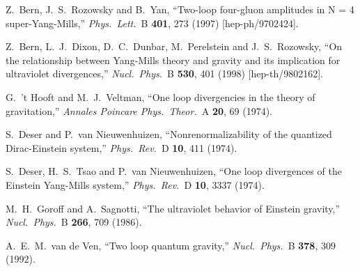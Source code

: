 \begin{thebibliography}{99}
Z.~Bern, J.~S.~Rozowsky and B.~Yan,
``Two-loop four-gluon amplitudes in N = 4 super-Yang-Mills,''
{\it Phys.\ Lett.}\ B {\bf 401}, 273 (1997)
[hep-ph/9702424].

Z.~Bern, L.~J.~Dixon, D.~C.~Dunbar, M.~Perelstein and J.~S.~Rozowsky,
``On the relationship between Yang-Mills theory and gravity and its
  implication for ultraviolet divergences,''
{\it Nucl.\ Phys.}\ B {\bf 530}, 401 (1998)
[hep-th/9802162].

G.~'t Hooft and M.~J.~Veltman,
``One loop divergencies in the theory of gravitation,''
{\it Annales Poincare Phys.\ Theor.}\ A {\bf 20}, 69 (1974).

S.~Deser and P.~van Nieuwenhuizen,
``Nonrenormalizability of the quantized Dirac-Einstein system,''
{\it Phys.\ Rev.}\ D {\bf 10}, 411 (1974).

S.~Deser, H.~S.~Tsao and P.~van Nieuwenhuizen,
``One loop divergences of the Einstein Yang-Mills system,''
{\it Phys.\ Rev.}\ D {\bf 10}, 3337 (1974).

M.~H.~Goroff and A.~Sagnotti,
``The ultraviolet behavior of Einstein gravity,''
{\it Nucl.\ Phys.}\ B {\bf 266}, 709 (1986).

A.~E.~M.~van de Ven,
``Two loop quantum gravity,''
{\it Nucl.\ Phys.}\ B {\bf 378}, 309 (1992).


\end{thebibliography}
